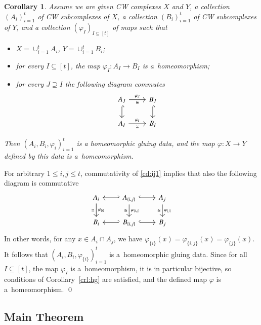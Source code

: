 \documentclass{amsart}[10pt]
\newtheorem{crl}[theorem]{Corollary}
\newcommand{\pr}{\nin{\bf Proof.} }
\numberwithin{equation}{section}
\numberwithin{figure}{section}
\numberwithin{table}{section}
\begin{document}
\begin{crl}\label{crl:hg2}
Assume we are given CW complexes $X$ and $Y$, a collection
$(A_i)_{i=1}^t$ of CW subcomplexes of $X$, a collection
$(B_i)_{i=1}^t$ of CW subcomplexes of $Y$, and a collection
$(\varphi_I)_{I\subseteq[t]}$ of maps such that 
\begin{itemize}
\item $X=\cup_{i=1}^t A_i$, $Y=\cup_{i=1}^t B_i$; 
\item for every $I\subseteq[t]$, the map $\varphi_I:A_I\rightarrow
  B_I$ is a~homeomorphism;
\item for every $J\supseteq I$ the following diagram commutes
\begin{equation} \label{cd:ij1}
\begin{tikzcd}
A_J\arrow{r}{\varphi_J}[swap]{\cong}\arrow[hookrightarrow]{d} 
&B_J\arrow[hookrightarrow]{d} \\
A_I \arrow{r}{\varphi_I}[swap]{\cong} &B_I
\end{tikzcd}
\end{equation}
\end{itemize}
Then $(A_i,B_i,\varphi_i)_{i=1}^t$ is a homeomorphic gluing data, and
the map $\varphi:X\rightarrow Y$ defined by this data is
a~homeomorphism.
\end{crl}
\pr For arbitrary $1\leq i,j\leq t$, commutativity of \eqref{cd:ij1}
implies that also the following diagram is commutative
\[\begin{tikzcd}
A_i\arrow[hookleftarrow]{r}\arrow{d}{\varphi_{\{i\}}}[swap]{\cong} 
&A_{\{i,j\}}\arrow[hookrightarrow]{r}\arrow{d}{\varphi_{\{i,j\}}}[swap]{\cong} 
&A_j\arrow{d}{\varphi_{\{j\}}}[swap]{\cong} \\
B_i\arrow[hookleftarrow]{r} 
&B_{\{i,j\}}\arrow[hookrightarrow]{r} &B_j
\end{tikzcd}\]
In other words, for any $x\in A_i\cap A_j$, we have
$\varphi_{\{i\}}(x)=\varphi_{\{i,j\}}(x)=\varphi_{\{j\}}(x)$.  It
follows that $(A_i,B_i,\varphi_{\{i\}})_{i=1}^t$ is a~homeomorphic
gluing data. Since for all $I\subseteq[t]$, the map $\varphi_I$ is
a~homeomorphism, it is in particular bijective, so conditions of
Corollary~\ref{crl:hg} are satisfied, and the defined map $\varphi$ is
a~homeomorphism. \qed





\subsection{Main Theorem}
\end{document}
